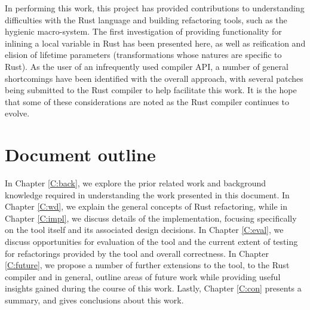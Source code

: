 In performing this work, this project has provided contributions to understanding difficulties with the Rust language and building refactoring tools, such as the hygienic macro-system. The first investigation of providing functionality for inlining a local variable in Rust has been presented here, as well as reification and elision of lifetime parameters (transformations whose natures are specific to Rust). As the user of an infrequently used compiler API, a number of general shortcomings have been identified with the overall approach, with several patches being submitted to the Rust compiler to help facilitate this work. It is the hope that some of these considerations are noted as the Rust compiler continues to evolve.

\section{Document outline}\label{S:outline}
In Chapter \ref{C:back}, we explore the prior related work and background knowledge required in understanding the work presented in this document. In Chapter \ref{C:wd}, we explain the general concepts of Rust refactoring, while in Chapter \ref{C:impl}, we discuss details of the implementation, focusing specifically on the tool itself and its associated design decisions. In Chapter \ref{C:eval}, we discuss opportunities for evaluation of the tool and the current extent of testing for refactorings provided by the tool and overall correctness. In Chapter \ref{C:future}, we propose a number of further extensions to the tool, to the Rust compiler and in general, outline areas of future work while providing useful insights gained during the course of this work. Lastly, Chapter \ref{C:con} presents a summary, and gives conclusions about this work.